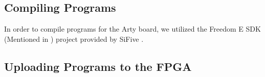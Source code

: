 \subsection{Compiling Programs}\label{sec:Compiling_Programs}
	In order to compile programs for the Arty board, we utilized the Freedom E SDK (Mentioned in ) project provided by SiFive \cite{freedomESDK}. 
\subsection{Uploading Programs to the FPGA}\label{sec:Upload_Programs_to_Flashed_FPGA}
